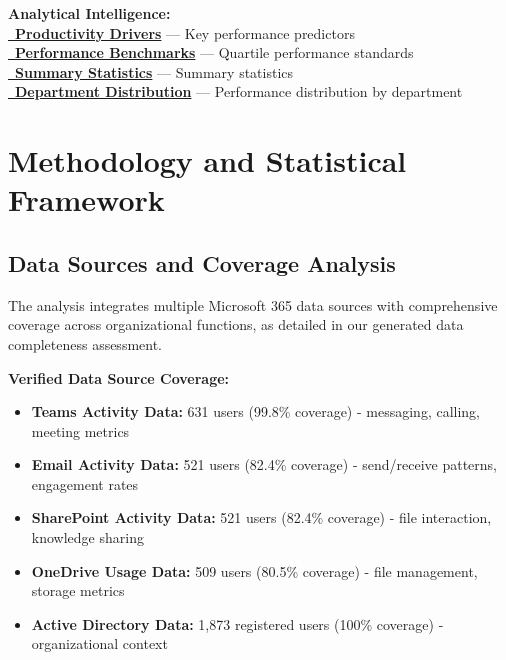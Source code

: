 \documentclass[12pt,a4paper]{article}
\begin{document}
\begin{resourcebox}
\textbf{Analytical Intelligence:}\\
\textcolor{successGreen}{\href{https://fixysaskihumorizijuv.supabase.co/storage/v1/object/public/research-files/dd2c8aa8-1c3d-4592-8ce2-9e275d102803-productivity_drivers_correlation.csv?download=}{{\normalsize\faCogs}\, \textbf{Productivity Drivers}}} — Key performance predictors\\
\textcolor{primaryGold}{\href{https://fixysaskihumorizijuv.supabase.co/storage/v1/object/public/research-files/e3bd4059-8cc7-437f-8aab-a2ed0700120e-performance_benchmarks_by_quartile.csv?download=}{{\normalsize\faChartArea}\, \textbf{Performance Benchmarks}}} — Quartile performance standards\\
\textcolor{mediumGray}{\href{https://fixysaskihumorizijuv.supabase.co/storage/v1/object/public/research-files/74906882-50ed-4947-8d41-ff2fcf4bebf3-overall_productivity_summary.csv?download=}{{\normalsize\faClipboard}\, \textbf{Summary Statistics}}} — Summary statistics\\
\textcolor{primaryBlue}{\href{https://fixysaskihumorizijuv.supabase.co/storage/v1/object/public/research-files/61dcab8f-47f2-46f1-855f-7e95c4447bf0-department_performance_distribution.csv?download=}{{\normalsize\faSitemap}\, \textbf{Department Distribution}}} — Performance distribution by department\\[0.5em]


\end{resourcebox}


\newpage
\section{Methodology and Statistical Framework}

\subsection{Data Sources and Coverage Analysis}

The analysis integrates multiple Microsoft 365 data sources with comprehensive coverage across organizational functions, as detailed in our generated data completeness assessment.

\begin{featurebox}
\textbf{\faDatabase \quad Verified Data Source Coverage:}
\begin{itemize}
    \item \textbf{Teams Activity Data:} 631 users (99.8\% coverage) - messaging, calling, meeting metrics
    \item \textbf{Email Activity Data:} 521 users (82.4\% coverage) - send/receive patterns, engagement rates
    \item \textbf{SharePoint Activity Data:} 521 users (82.4\% coverage) - file interaction, knowledge sharing
    \item \textbf{OneDrive Usage Data:} 509 users (80.5\% coverage) - file management, storage metrics
    \item \textbf{Active Directory Data:} 1,873 registered users (100\% coverage) - organizational context
\end{itemize}
\end{featurebox}
\end{document}
